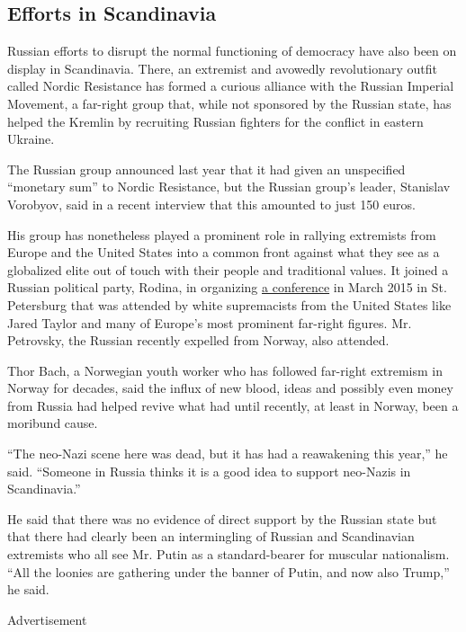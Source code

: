 \hypertarget{efforts-in-scandinavia}{%
\subsection{Efforts in Scandinavia}\label{efforts-in-scandinavia}}

Russian efforts to disrupt the normal functioning of democracy have also
been on display in Scandinavia. There, an extremist and avowedly
revolutionary outfit called Nordic Resistance has formed a curious
alliance with the Russian Imperial Movement, a far-right group that,
while not sponsored by the Russian state, has helped the Kremlin by
recruiting Russian fighters for the conflict in eastern Ukraine.

The Russian group announced last year that it had given an unspecified
``monetary sum'' to Nordic Resistance, but the Russian group's leader,
Stanislav Vorobyov, said in a recent interview that this amounted to
just 150 euros.

His group has nonetheless played a prominent role in rallying extremists
from Europe and the United States into a common front against what they
see as a globalized elite out of touch with their people and traditional
values. It joined a Russian political party, Rodina, in organizing
\href{http://www.nytimes.com/2015/03/23/world/europe/right-wing-groups-find-a-haven-for-a-day-in-russia.html}{a
conference} in March 2015 in St. Petersburg that was attended by white
supremacists from the United States like Jared Taylor and many of
Europe's most prominent far-right figures. Mr. Petrovsky, the Russian
recently expelled from Norway, also attended.

Thor Bach, a Norwegian youth worker who has followed far-right extremism
in Norway for decades, said the influx of new blood, ideas and possibly
even money from Russia had helped revive what had until recently, at
least in Norway, been a moribund cause.

``The neo-Nazi scene here was dead, but it has had a reawakening this
year,'' he said. ``Someone in Russia thinks it is a good idea to support
neo-Nazis in Scandinavia.''

He said that there was no evidence of direct support by the Russian
state but that there had clearly been an intermingling of Russian and
Scandinavian extremists who all see Mr. Putin as a standard-bearer for
muscular nationalism. ``All the loonies are gathering under the banner
of Putin, and now also Trump,'' he said.

Advertisement


